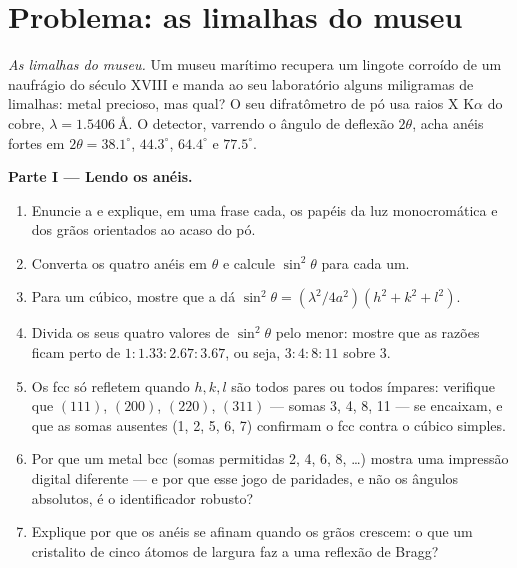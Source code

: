 \section{Problema: as limalhas do museu}

\begin{problem}\label{pb:b3:crystalline-solids:1}
\emph{As limalhas do museu.} Um museu marítimo recupera um lingote
corroído de um naufrágio do século XVIII e manda ao seu laboratório
alguns miligramas de limalhas: metal precioso, mas qual? O seu
difratômetro de pó usa raios X K$\alpha$ do cobre,
$\lambda = \qty{1.5406}{\angstrom}$. O detector, varrendo o
ângulo de deflexão $2\theta$, acha anéis fortes em $2\theta =
38.1^\circ$, $44.3^\circ$, $64.4^\circ$ e $77.5^\circ$.

\medskip\noindent\textbf{Parte I --- Lendo os anéis.}

\begin{enumerate}
  \item Enuncie a  e explique, em uma frase cada, os
        papéis da luz monocromática e dos grãos orientados ao acaso
        do pó.
  \item Converta os quatro anéis em $\theta$ e calcule
        $\sin^2\theta$ para cada um.
  \item Para um  cúbico, mostre que a  dá
        $\sin^2\theta = (\lambda^2/4a^2)(h^2 + k^2 + l^2)$.
  \item Divida os seus quatro valores de $\sin^2\theta$ pelo menor:
        mostre que as razões ficam perto de $1 : 1.33 : 2.67 : 3.67$,
        ou seja, $3 : 4 : 8 : 11$ sobre 3.
  \item Os  fcc só refletem quando $h, k, l$ são todos pares ou
        todos ímpares: verifique que $(111)$, $(200)$, $(220)$, $(311)$ ---
        somas 3, 4, 8, 11 --- se encaixam, e que as somas ausentes
        (1, 2, 5, 6, 7) confirmam o fcc contra o cúbico simples.
  \item Por que um metal bcc (somas permitidas 2, 4, 6, 8, \dots) mostra
        uma impressão digital diferente --- e por que esse jogo de
        paridades, e não os ângulos absolutos, é o identificador robusto?
  \item Explique por que os anéis se afinam quando os grãos crescem: o
        que um cristalito de cinco átomos de largura faz a uma reflexão de Bragg?
\end{enumerate}


\end{problem}
